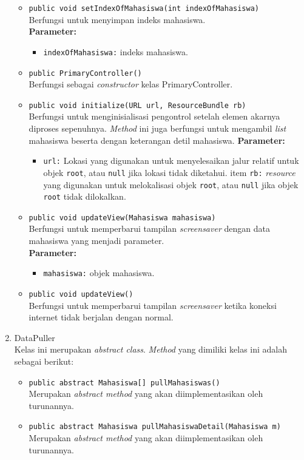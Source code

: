 \begin{enumerate}
\begin{itemize}
    \item \texttt{public void setIndexOfMahasiswa(int indexOfMahasiswa)}\\
    Berfungsi untuk menyimpan indeks mahasiswa.\\
    \textbf{Parameter:}
	\begin{itemize}
		\item \texttt{indexOfMahasiswa:} indeks mahasiswa.
	\end{itemize}
    \item \texttt{public PrimaryController()}\\
    Berfungsi sebagai \textit{constructor} kelas PrimaryController.
    \item \texttt{public void initialize(URL url, ResourceBundle rb)}\\
    Berfungsi untuk menginisialisasi pengontrol setelah elemen akarnya diproses sepenuhnya. \textit{Method} ini juga berfungsi untuk mengambil \textit{list} mahasiswa beserta dengan keterangan detil mahasiswa.
     \textbf{Parameter:}
	\begin{itemize}
		\item \texttt{url:} Lokasi yang digunakan untuk menyelesaikan jalur relatif untuk objek \texttt{root}, atau \texttt{null} jika lokasi tidak diketahui.
		item \texttt{rb:} \textit{resource} yang digunakan untuk melokalisasi objek \texttt{root}, atau \texttt{null} jika objek \texttt{root} tidak dilokalkan.
	\end{itemize}
    \item \texttt{public void updateView(Mahasiswa mahasiswa)}\\
    Berfungsi untuk memperbarui tampilan \textit{screensaver} dengan data mahasiswa yang menjadi parameter. \\
    \textbf{Parameter:}
	\begin{itemize}
		\item \texttt{mahasiswa:} objek mahasiswa.
	\end{itemize}
	\item \texttt{public void updateView()}\\
    Berfungsi untuk memperbarui tampilan \textit{screensaver} ketika koneksi internet tidak berjalan dengan normal. \\
\end{itemize}

\item{DataPuller}\\
\label{datapuller}
Kelas ini merupakan \textit{abstract class}. \textit{Method} yang dimiliki kelas ini adalah sebagai berikut:
\begin{itemize}
	\item \texttt{public abstract Mahasiswa[] pullMahasiswas()}\\
    Merupakan \textit{abstract method} yang akan diimplementasikan oleh turunannya.
	
	\item \texttt{public abstract Mahasiswa pullMahasiswaDetail(Mahasiswa m)}\\
    Merupakan \textit{abstract method} yang akan diimplementasikan oleh turunannya.
\end{itemize}
\end{enumerate}

